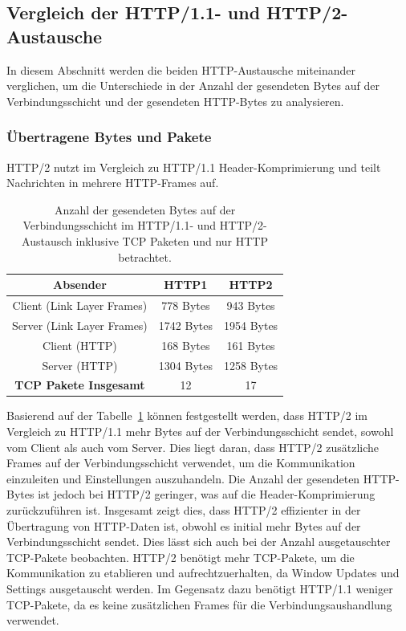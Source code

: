 \FloatBarrier
\subsection{Vergleich der HTTP/1.1- und HTTP/2-Austausche}

In diesem Abschnitt werden die beiden HTTP-Austausche miteinander verglichen, um die Unterschiede in der Anzahl der gesendeten Bytes auf der Verbindungsschicht und der gesendeten HTTP-Bytes zu analysieren.

\subsubsection{Übertragene Bytes und Pakete}

HTTP/2 nutzt im Vergleich zu HTTP/1.1 Header-Komprimierung und teilt Nachrichten in mehrere HTTP-Frames auf.

\begin{table}[ht]
    \centering
    \begin{tabular}{|c|c|c|}
        \hline
        \textbf{Absender} & \textbf{HTTP1} & \textbf{HTTP2} \\
        \hline
        Client (Link Layer Frames) & 778 Bytes & 943 Bytes \\
        Server (Link Layer Frames) & 1742 Bytes & 1954 Bytes \\
        Client (HTTP) & 168 Bytes & 161 Bytes \\
        Server (HTTP) & 1304 Bytes & 1258 Bytes \\
        \hline
        \textbf{TCP Pakete Insgesamt} & 12 & 17 \\
        \hline
    \end{tabular}
    \caption{Anzahl der gesendeten Bytes auf der Verbindungsschicht im HTTP/1.1- und HTTP/2-Austausch inklusive TCP Paketen und nur HTTP betrachtet.}
    \label{tab:bytes}
\end{table}

Basierend auf der Tabelle~\ref{tab:bytes} können festgestellt werden, dass HTTP/2 im Vergleich zu HTTP/1.1 mehr Bytes auf der Verbindungsschicht sendet, sowohl vom Client als auch vom Server.
Dies liegt daran, dass HTTP/2 zusätzliche Frames auf der Verbindungsschicht verwendet, um die Kommunikation einzuleiten und Einstellungen auszuhandeln.
Die Anzahl der gesendeten HTTP-Bytes ist jedoch bei HTTP/2 geringer, was auf die Header-Komprimierung zurückzuführen ist.
Insgesamt zeigt dies, dass HTTP/2 effizienter in der Übertragung von HTTP-Daten ist, obwohl es initial mehr Bytes auf der Verbindungsschicht sendet.
Dies lässt sich auch bei der Anzahl ausgetauschter TCP-Pakete beobachten.
HTTP/2 benötigt mehr TCP-Pakete, um die Kommunikation zu etablieren und aufrechtzuerhalten, da Window Updates und Settings ausgetauscht werden.
Im Gegensatz dazu benötigt HTTP/1.1 weniger TCP-Pakete, da es keine zusätzlichen Frames für die Verbindungsaushandlung verwendet.

